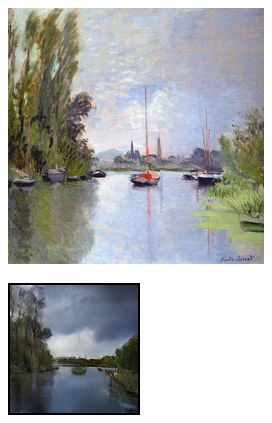 \documentclass{article}
\begin{document}
\begin{figure}[H]
    \begin{subfigure}{.112\textwidth}
        \centering
        \includegraphics[width=\linewidth]{00030.jpg}
    \end{subfigure}%
    \begin{subfigure}{.112\textwidth}
        \centering
        \includegraphics[width=\linewidth]{0003.png}

\end{subfigure}
\end{figure}
\end{document}
